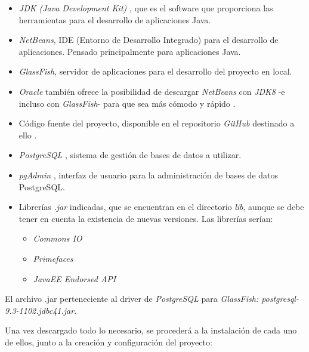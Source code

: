 \begin{itemize}
\item \textit{JDK (Java Development Kit)} \cite{JDK}, que es el software que proporciona las herramientas para el desarrollo de aplicaciones Java.
\item \textit{NetBeans}, IDE (Entorno de Desarrollo Integrado) para el desarrollo de aplicaciones. Pensado principalmente para aplicaciones Java.
\item \textit{GlassFish}, servidor de aplicaciones para el desarrollo del proyecto en local.
\item \textit{Oracle} también ofrece la posibilidad de descargar \textit{NetBeans} con \textit{JDK8} -e incluso con \textit{GlassFish}- para que sea más cómodo y rápido \cite{NetBeans-con-JDK}.
\item Código fuente del proyecto, disponible en el repositorio \textit{GitHub} destinado a ello \cite{github-booking}.
\item \textit{PostgreSQL} \cite{PostgreSQL}, sistema de gestión de bases de datos a utilizar.
\item \textit{pgAdmin} \cite{pgAdmin}, interfaz de usuario para la administración de bases de datos PostgreSQL.
\item Librerías \textit{.jar} indicadas, que se encuentran en el directorio \textit{lib}, aunque se debe tener en cuenta la existencia de nuevas versiones. Las librerías serían:

\begin{itemize}
\item \textit{Commons IO}
\item \textit{Primefaces}
\item \textit{JavaEE Endorsed API}
\end{itemize}
\end{itemize}

\item El archivo .jar perteneciente al driver de \textit{PostgreSQL} para \textit{GlassFish: postgresql-9.3-1102.jdbc41.jar}.

Una vez descargado todo lo necesario, se procederá a la instalación de cada uno de ellos, junto a la creación y configuración del proyecto:

